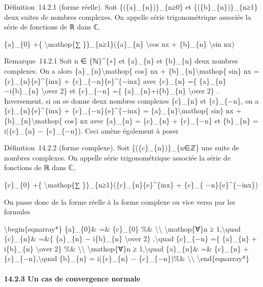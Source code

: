 \documentclass[]{article}
\begin{document}
Définition~14.2.1 (forme réelle). Soit \{(\{a\}\_\{n\})\}\_\{n≥0\} et
\{(\{b\}\_\{n\})\}\_\{n≥1\} deux suites de nombres complexes. On appelle
série trigonométrique associée la série de fonctions de ℝ dans ℂ,

\{a\}\_\{0\} +\{ \textbackslash{}mathop\{∑ \}\}\_\{n≥1\}(\{a\}\_\{n\}
\textbackslash{}cos nx + \{b\}\_\{n\} \textbackslash{}sin nx)

Remarque~14.2.1 Soit n ∈ \{ℕ\}\^{}\{∗\} et \{a\}\_\{n\} et \{b\}\_\{n\}
deux nombres complexes. On a alors \{a\}\_\{n\}\textbackslash{}mathop\{
cos\} nx + \{b\}\_\{n\}\textbackslash{}mathop\{ sin\} nx =
\{c\}\_\{n\}\{e\}\^{}\{inx\} + \{c\}\_\{−n\}\{e\}\^{}\{−inx\} avec
\{c\}\_\{n\} =\{ \{a\}\_\{n\}−i\{b\}\_\{n\} \textbackslash{}over 2\} et
\{c\}\_\{−n\} =\{ \{a\}\_\{n\}+i\{b\}\_\{n\} \textbackslash{}over 2\} .
Inversement, si on se donne deux nombres complexes \{c\}\_\{n\} et
\{c\}\_\{−n\}, on a \{c\}\_\{n\}\{e\}\^{}\{inx\} +
\{c\}\_\{−n\}\{e\}\^{}\{−inx\} = \{a\}\_\{n\}\textbackslash{}mathop\{
sin\} nx + \{b\}\_\{n\}\textbackslash{}mathop\{ cos\} nx avec
\{a\}\_\{n\} = \{c\}\_\{n\} + \{c\}\_\{−n\} et \{b\}\_\{n\} =
i(\{c\}\_\{n\} − \{c\}\_\{−n\}). Ceci amène également à poser

Définition~14.2.2 (forme complexe). Soit \{(\{c\}\_\{n\})\}\_\{n∈ℤ\} une
suite de nombres complexes. On appelle série trigonométrique associée la
série de fonctions de ℝ dans ℂ,

\{c\}\_\{0\} +\{ \textbackslash{}mathop\{∑
\}\}\_\{n≥1\}(\{c\}\_\{n\}\{e\}\^{}\{inx\} + \{c\}\_\{
−n\}\{e\}\^{}\{−inx\})

On passe donc de la forme réelle à la forme complexe ou vice versa par
les formules

\textbackslash{}begin\{eqnarray*\} \{a\}\_\{0\}\& =\& \{c\}\_\{0\} \%\&
\textbackslash{}\textbackslash{} \textbackslash{}mathop\{∀\}n ≥
1,\textbackslash{}quad \{c\}\_\{n\}\& =\&\{ \{a\}\_\{n\} − i\{b\}\_\{n\}
\textbackslash{}over 2\} ,\textbackslash{}quad \{c\}\_\{−n\} =\{
\{a\}\_\{n\} + i\{b\}\_\{n\} \textbackslash{}over 2\} \%\&
\textbackslash{}\textbackslash{} \textbackslash{}mathop\{∀\}n ≥
1,\textbackslash{}quad \{a\}\_\{n\}\& =\& \{c\}\_\{n\} +
\{c\}\_\{−n\},\textbackslash{}quad \{b\}\_\{n\} = i(\{c\}\_\{n\} −
\{c\}\_\{−n\})\%\& \textbackslash{}\textbackslash{}
\textbackslash{}end\{eqnarray*\}

\paragraph{14.2.3 Un cas de convergence normale}
\end{document}
